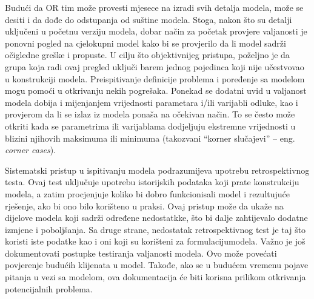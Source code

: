 \documentclass[a4paper, utf8, 11pt, colorlinks]{book}
\theoremstyle{definition}
\begin{document}
Budući da OR tim može provesti mjesece na izradi svih detalja modela, može se desiti i da dođe do odstupanja od suštine modela. Stoga, nakon što su detalji uključeni u 
početnu verziju modela, dobar način za početak provjere valjanosti je ponovni pogled na cjelokupni model kako bi se provjerilo da li model sadrži  očigledne greške i propuste. U cilju što objektivnijeg pristupa, poželjno je da grupa koja radi ovaj pregled uključi barem jednog pojedinca koji nije učestvovao u konstrukciji modela. Preispitivanje definicije
problema i poređenje sa modelom mogu pomoći u otkrivanju nekih pogrešaka.  Ponekad se  dodatni uvid u valjanost modela dobija i 
mijenjanjem vrijednosti parametara i/ili varijabli odluke, kao i provjerom da li se  izlaz iz modela ponaša na očekivan način. To se često može otkriti kada se parametrima ili varijablama dodjeljuju ekstremne vrijednosti u blizini njihovih maksimuma ili minimuma (takozvani ``korner slučajevi'' -- eng. \textit{corner cases}). 

Sistematski pristup u ispitivanju modela podrazumijeva upotrebu retrospektivnog testa. Ovaj test uključuje upotrebu istorijskih podataka koji prate konstrukciju modela, a zatim procjenjuje koliko bi dobro funkcionisali model i rezultujuće rješenje, ako bi ono  bilo korišteno u praksi.  Ovaj pristup može da ukaže na dijelove modela koji sadrži određene nedostatkke, što bi dalje zahtijevalo dodatne izmjene i poboljšanja. 
Sa druge strane, nedostatak retrospektivnog test je taj što koristi iste podatke kao i oni koji su korišteni za formulacijumodela. %
Važno je još dokumentovati postupke testiranja valjanosti modela. Ovo može  povećati povjerenje budućih klijenata u model. Takođe, ako se u budućem vremenu pojave pitanja u vezi sa modelom, ova dokumentacija će  biti korisna prilikom otkrivanja potencijalnih problema. 

\end{document}

